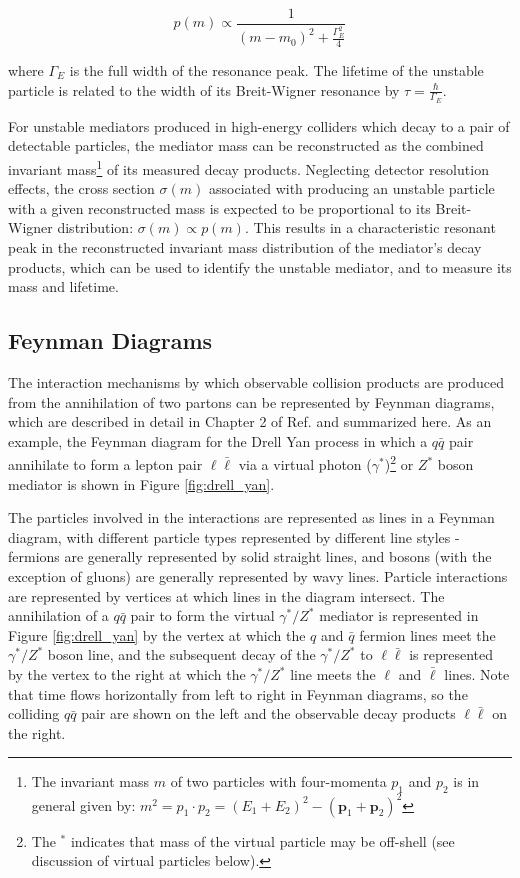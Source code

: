 \begin{equation}
\label{eq:breit_wigner}
p(m) \propto \frac{1}{(m-m_0)^2 + \frac{\Gamma_E^2}{4}}
\end{equation}

\noindent where \(\Gamma_E\) is the full width of the resonance peak. The lifetime of the unstable particle is related to the width of its Breit-Wigner resonance by \(\tau = \frac{\hbar}{\Gamma_E}\).

For unstable mediators produced in high-energy colliders which decay to a pair of detectable particles, the mediator mass can be reconstructed as the combined invariant mass\footnote{The invariant mass \(m\) of two particles with four-momenta \(p_1\) and \(p_2\) is in general given by: \(m^2 = p_1 \cdot p_2 = (E_1+E_2)^2 - (\mathbf{p}_1+\mathbf{p}_2)^2\)} of its measured decay products. Neglecting detector resolution effects, the cross section \(\sigma(m)\) associated with producing an unstable particle with a given reconstructed mass is expected to be proportional to its Breit-Wigner distribution: \(\sigma(m)\propto p(m)\). This results in a characteristic resonant peak in the reconstructed invariant mass distribution of the mediator's decay products, which can be used to identify the unstable mediator, and to measure its mass and lifetime.

\subsection{Feynman Diagrams}

The interaction mechanisms by which observable collision products are produced from the annihilation of two partons can be represented by Feynman diagrams, which are described in detail in Chapter 2 of Ref. \cite{griffiths_2008} and summarized here. As an example, the Feynman diagram for the Drell Yan process in which a \(q\bar{q}\) pair annihilate to form a lepton pair \(\ell\bar{\ell}\) via a virtual photon (\(\gamma^{*}\))\footnote{The \(^{*}\) indicates that mass of the virtual particle may be off-shell (see discussion of virtual particles below).} or \(Z^{*}\) boson mediator is shown in Figure \ref{fig:drell_yan}. 

The particles involved in the interactions are represented as lines in a Feynman diagram, with different particle types represented by different line styles - fermions are generally represented by solid straight lines, and bosons (with the exception of gluons) are generally represented by wavy lines. Particle interactions are represented by vertices at which lines in the diagram intersect. The annihilation of a \(q\bar{q}\) pair to form the virtual \(\gamma^{*}/Z^{*}\) mediator is represented in Figure \ref{fig:drell_yan} by the vertex at which the \(q\) and \(\bar{q}\) fermion lines meet the \(\gamma^{*}/Z^{*}\) boson line, and the subsequent decay of the  \(\gamma^{*}/Z^{*}\) to \(\ell\bar{\ell}\) is represented by the vertex to the right at which the \(\gamma^{*}/Z^{*}\) line meets the \(\ell\) and \(\bar{\ell}\) lines. Note that time flows horizontally from left to right in Feynman diagrams, so the colliding \(q\bar{q}\) pair are shown on the left and the observable decay products \(\ell\bar{\ell}\) on the right.

